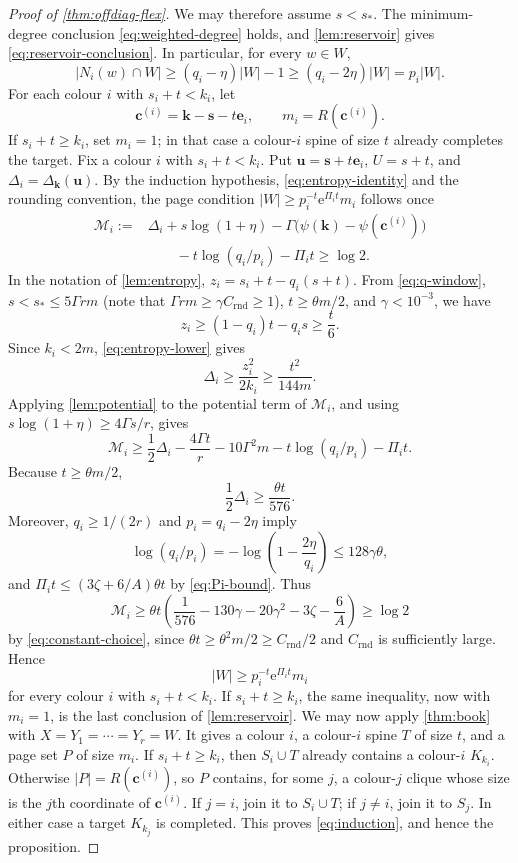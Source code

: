 \documentclass[10pt,a4paper]{amsart}
\newcommand{\DG}{\Delta}
\newcommand{\cc}{\mathbf c}
\newcommand{\e}{\mathrm e}
\newcommand{\ee}{\mathbf e}
\newcommand{\kk}{\mathbf k}
\newcommand{\pot}{\psi}
\newcommand{\ssv}{\mathbf s}
\newcommand{\uu}{\mathbf u}
\begin{document}
\begin{proof}[Proof of \cref{thm:offdiag-flex}]
We may therefore assume $s<s_\ast$.  The minimum-degree conclusion
\eqref{eq:weighted-degree} holds, and \cref{lem:reservoir} gives
\eqref{eq:reservoir-conclusion}.  In particular, for every $w\in W$,
\[
 |N_i(w)\cap W|
 \ge(q_i-\eta)|W|-1
 \ge(q_i-2\eta)|W|=p_i|W|.
\]
For each colour $i$ with $s_i+t<k_i$, let
\[
 \cc^{(i)}=\kk-\ssv-t\ee_i,
 \qquad m_i=R(\cc^{(i)}).
\]
If $s_i+t\ge k_i$, set $m_i=1$; in that case a colour-$i$ spine of size
$t$ already completes the target.
Fix a colour $i$ with $s_i+t<k_i$.  Put
$\uu=\ssv+t\ee_i$, $U=s+t$, and
$\DG_i=\DG_{\kk}(\uu)$.  By the induction hypothesis,
\eqref{eq:entropy-identity} and the rounding convention, the page condition
$|W|\ge p_i^{-t}\e^{\Pi_it}m_i$ follows once
\begin{align*}
 \mathcal M_i:={}&
 \DG_i+s\log(1+\eta)
 -\Gamma\bigl(\pot(\kk)-\pot(\cc^{(i)})\bigr)\\
 &\qquad -t\log(q_i/p_i)-\Pi_it\ge\log2.
\end{align*}
In the notation of \cref{lem:entropy}, $z_i=s_i+t-q_i(s+t)$.  From
\eqref{eq:q-window},
$s<s_\ast\le5\Gamma rm$ (note that $\Gamma rm\ge\gamma C_{\mathrm{rnd}}\ge1$),
$t\ge\theta m/2$, and $\gamma<10^{-3}$, we have
\[
 z_i\ge(1-q_i)t-q_is\ge\frac t6.
\]
Since $k_i<2m$, \eqref{eq:entropy-lower} gives
\[
 \DG_i\ge\frac{z_i^2}{2k_i}\ge\frac{t^2}{144m}.
\]
Applying \cref{lem:potential} to the potential term of $\mathcal M_i$, and
using $s\log(1+\eta)\ge4\Gamma s/r$, gives
\[
 \mathcal M_i\ge
 \frac12\DG_i-\frac{4\Gamma t}{r}-10\Gamma^2m
 -t\log(q_i/p_i)-\Pi_it.
\]
Because $t\ge\theta m/2$,
\[
 \frac12\DG_i\ge\frac{\theta t}{576}.
\]
Moreover, $q_i\ge1/(2r)$ and $p_i=q_i-2\eta$ imply
\[
 \log(q_i/p_i)
 =-\log\left(1-\frac{2\eta}{q_i}\right)
 \le128\gamma\theta,
\]
and $\Pi_it\le(3\zeta+6/A)\theta t$ by \eqref{eq:Pi-bound}.  Thus
\begin{equation}\label{eq:page-positive}
 \mathcal M_i\ge
 \theta t\left(
 \frac1{576}-130\gamma-20\gamma^2-3\zeta-\frac6A
 \right)\ge\log2
\end{equation}
by \eqref{eq:constant-choice}, since
$\theta t\ge\theta^2m/2\ge C_{\mathrm{rnd}}/2$ and $C_{\mathrm{rnd}}$ is
sufficiently large.  Hence
\[
 |W|\ge p_i^{-t}\e^{\Pi_it}m_i
\]
for every colour $i$ with $s_i+t<k_i$.  If $s_i+t\ge k_i$, the same
inequality, now with $m_i=1$, is the last conclusion of \cref{lem:reservoir}.
We may now apply \cref{thm:book} with
$X=Y_1=\cdots=Y_r=W$.  It gives a colour $i$, a colour-$i$ spine $T$ of size
$t$, and a page set $P$ of size $m_i$.  If $s_i+t\ge k_i$, then
$S_i\cup T$ already contains a colour-$i$ $K_{k_i}$.  Otherwise
$|P|=R(\cc^{(i)})$, so $P$ contains, for some $j$, a colour-$j$ clique
whose size is the $j$th coordinate of $\cc^{(i)}$.  If $j=i$, join it to
$S_i\cup T$; if $j\ne i$,
join it to $S_j$.  In either case a target $K_{k_j}$ is completed.  This
proves \eqref{eq:induction}, and hence the proposition.
\end{proof}
\end{document}
